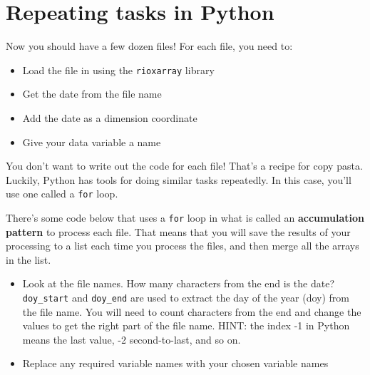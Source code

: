 \documentclass[
  letterpaper,
  DIV=11,
  numbers=noendperiod,
  oneside]{scrreprt}
\providecommand{\tightlist}{%
  \setlength{\itemsep}{0pt}\setlength{\parskip}{0pt}}
\begin{document}
\section{Repeating tasks in Python}\label{repeating-tasks-in-python-2}

Now you should have a few dozen files! For each file, you need to:

\begin{itemize}
\tightlist
\item
  Load the file in using the \texttt{rioxarray} library
\item
  Get the date from the file name
\item
  Add the date as a dimension coordinate
\item
  Give your data variable a name
\end{itemize}

You don't want to write out the code for each file! That's a recipe for
copy pasta. Luckily, Python has tools for doing similar tasks
repeatedly. In this case, you'll use one called a \texttt{for} loop.

There's some code below that uses a \texttt{for} loop in what is called
an \textbf{accumulation pattern} to process each file. That means that
you will save the results of your processing to a list each time you
process the files, and then merge all the arrays in the list.

\begin{tcolorbox}[enhanced jigsaw, colbacktitle=quarto-callout-color!10!white, opacityback=0, bottomtitle=1mm, toptitle=1mm, bottomrule=.15mm, left=2mm, colframe=quarto-callout-color-frame, leftrule=.75mm, opacitybacktitle=0.6, colback=white, rightrule=.15mm, toprule=.15mm, breakable, titlerule=0mm, title=\textcolor{quarto-callout-color}{\faInfo}\hspace{0.5em}{Try It}, coltitle=black, arc=.35mm]

\begin{itemize}
\tightlist
\item
  Look at the file names. How many characters from the end is the date?
  \texttt{doy\_start} and \texttt{doy\_end} are used to extract the day
  of the year (doy) from the file name. You will need to count
  characters from the end and change the values to get the right part of
  the file name. HINT: the index -1 in Python means the last value, -2
  second-to-last, and so on.
\item
  Replace any required variable names with your chosen variable names
\end{itemize}

\end{tcolorbox}
\end{document}
